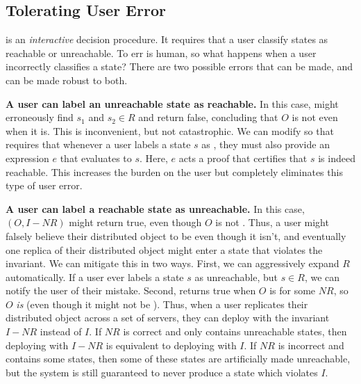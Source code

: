 \subsection{Tolerating User Error}
 is an \emph{interactive} decision
procedure. It requires that a user classify states as reachable or unreachable.
To err is human, so what happens when a user incorrectly classifies a state?
There are two possible errors that can be made, and
 can be made robust to both.

\textbf{A user can label an unreachable state as reachable.}
In this case, \Helper{} might erroneously find $s_1$ and $s_2 \in R$ and return
false, concluding that $O$ is not \sTIconfluent{} even when it is.  This is
inconvenient, but not catastrophic. We can modify
 so that \Helper{} requires that whenever
a user labels a state $s$ as \sTIreachable{}, they must also provide an
\sTIreachable{} expression $e$ that evaluates to $s$. Here, $e$ acts a proof
that certifies that $s$ is indeed reachable. This increases the burden on the
user but completely eliminates this type of user error.

\textbf{A user can label a reachable state as unreachable.}
In this case, \IsIclosed$(O, I - NR)$ might return true, even though $O$ is not
\sTIconfluent. Thus, a user might falsely believe their distributed object to
be \sTIconfluent{} even though it isn't, and eventually one replica of their
distributed object might enter a state that violates the invariant.
%
We can mitigate this in two ways. First, we can aggressively expand $R$ automatically. If a
user ever labels a state $s$ as unreachable, but $s \in R$, we can notify the
user of their mistake. Second, \Helper{} returns true when $O$ is  for some $NR$, so $O$ \emph{is}  (even though
it might not be \sTIconfluent{}). Thus, when a user replicates their
distributed object across a set of servers, they can deploy with the invariant
$I - NR$ instead of $I$. If $NR$ is correct and only contains unreachable
states, then deploying with $I - NR$ is equivalent to deploying with $I$. If
$NR$ is incorrect and contains some \sTIreachable{} states, then some of these
states are artificially made unreachable, but the system is still guaranteed to
never produce a state which violates $I$.
